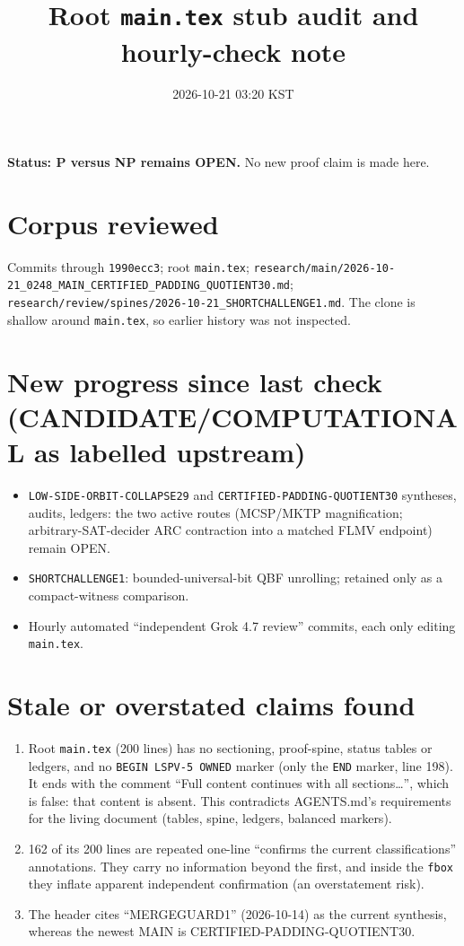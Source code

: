 \documentclass[11pt]{article}
\title{Root \texttt{main.tex} stub audit and hourly-check note}
\date{2026-10-21 03:20 KST}
\begin{document}
\maketitle
\textbf{Status: P versus NP remains OPEN.} No new proof claim is made here.

\section*{Corpus reviewed}
Commits through \texttt{1990ecc3}; root \texttt{main.tex}; \texttt{research/main/2026-10-21\_0248\_MAIN\_CERTIFIED\_PADDING\_QUOTIENT30.md};
\texttt{research/review/spines/2026-10-21\_SHORTCHALLENGE1.md}. The clone is shallow around \texttt{main.tex}, so earlier history was not inspected.

\section*{New progress since last check (CANDIDATE/COMPUTATIONAL as labelled upstream)}
\begin{itemize}
\item \texttt{LOW-SIDE-ORBIT-COLLAPSE29} and \texttt{CERTIFIED-PADDING-QUOTIENT30} syntheses, audits, ledgers: the two active routes
(MCSP/MKTP magnification; arbitrary-SAT-decider ARC contraction into a matched FLMV endpoint) remain OPEN.
\item \texttt{SHORTCHALLENGE1}: bounded-universal-bit QBF unrolling; retained only as a compact-witness comparison.
\item Hourly automated ``independent Grok 4.7 review'' commits, each only editing \texttt{main.tex}.
\end{itemize}

\section*{Stale or overstated claims found}
\begin{enumerate}
\item Root \texttt{main.tex} (200 lines) has no sectioning, proof-spine, status tables or ledgers, and no \texttt{BEGIN LSPV-5 OWNED} marker
(only the \texttt{END} marker, line 198). It ends with the comment ``Full content continues with all sections\ldots'', which is false: that content is absent.
This contradicts AGENTS.md's requirements for the living document (tables, spine, ledgers, balanced markers).
\item 162 of its 200 lines are repeated one-line ``confirms the current classifications'' annotations. They carry no information
beyond the first, and inside the \texttt{fbox} they inflate apparent independent confirmation (an overstatement risk).
\item The header cites ``MERGEGUARD1'' (2026-10-14) as the current synthesis, whereas the newest MAIN is CERTIFIED-PADDING-QUOTIENT30.
\end{enumerate}
\end{document}
